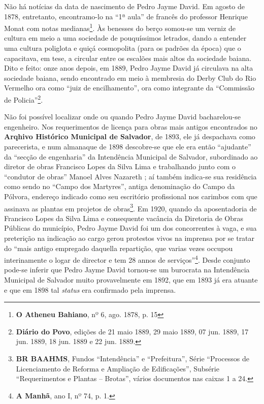 Não há notícias da data de nascimento de Pedro Jayme David. Em agosto de 1878, entretanto, encontramo-lo na ``1ª aula'' de francês do professor Henrique Monat com notas medianas\footnote{\textbf{O Atheneu Bahiano}, nº 6, ago. 1878, p. 15}. Às benesses do berço somou-se um verniz de cultura em meio a uma sociedade de pouquíssimos letrados, dando a entender uma cultura poliglota e quiçá cosmopolita (para os padrões da época) que o capacitava, em tese, a circular entre os escalões mais altos da sociedade baiana. Dito e feito: onze anos depois, em 1889, Pedro Jayme David já circulava na alta sociedade baiana, sendo encontrado em meio à membresia do Derby Club do Rio Vermelho ora como ``juiz de encilhamento'', ora como integrante da ``Commissão de Policia''\footnote{\textbf{Diário do Povo}, edições de 21 maio 1889, 29 maio 1889, 07 jun. 1889, 17 jun. 1889, 18 jun. 1889 e 22 jun. 1889.}. 

Não foi possível localizar onde ou quando Pedro Jayme David bacharelou-se engenheiro. Nos requerimentos de licença para obras mais antigos encontrados no \textbf{Arqhivo Histórico Municipal de Salvador}, de 1893, ele já despachava como parecerista, e num almanaque de 1898 descobre-se que ele era então ``ajudante'' da ``secção de engenharia'' da Intendência Municipal de Salvador, subordinado ao diretor de obras Francisco Lopes da Silva Lima e trabalhando junto com o ``condutor de obras'' Manoel Alves Nazareth \cite[p.~278]{reis_almanak_1898}; aí também indica-se sua residência como sendo no ``Campo dos Martyres'', antiga denominação do Campo da Pólvora, endereço indicado como seu escritório profissional nos carimbos com que assinava as plantas em projetos de obras\footnote{\textbf{BR BAAHMS}, Fundos ``Intendência'' e ``Prefeitura'', Série ``Processos de Licenciamento de Reforma e Ampliação de Edificações'', Subsérie ``Requerimentos e Plantas -- Brotas'', vários documentos nas caixas 1 a 24.}. Em 1920, quando da aposentadoria de Francisco Lopes da Silva Lima e consequente vacância da Diretoria de Obras Públicas do município, Pedro Jayme David foi um dos concorrentes à vaga, e sua preterição na indicação ao cargo gerou protestos vivos na imprensa por se tratar do ``mais antigo empregado daquella repartição, que varias vezes occupou interinamente o logar de director e tem 28 annos de serviços''\footnote{\textbf{A Manhã}, ano I, nº 74, p. 1.}. Desde conjunto pode-se inferir que Pedro Jayme David tornou-se um burocrata na Intendência Municipal de Salvador muito provavelmente em 1892, que em 1893 já era atuante e que em 1898 tal \textit{status} era confirmado pela imprensa.

